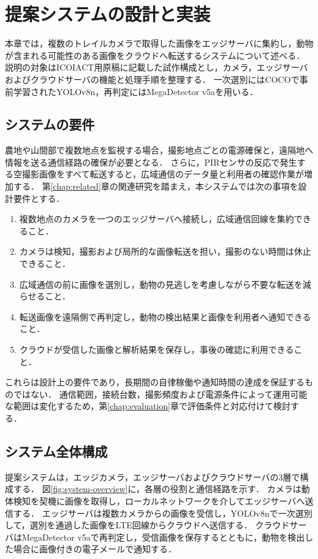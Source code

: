 \chapter{提案システムの設計と実装}
\label{chap:system}

本章では，複数のトレイルカメラで取得した画像をエッジサーバに集約し，動物が含まれる可能性のある画像をクラウドへ転送するシステムについて述べる．
説明の対象はICOIACT用原稿に記載した試作構成とし，カメラ，エッジサーバおよびクラウドサーバの機能と処理手順を整理する．
一次選別にはCOCOで事前学習されたYOLOv8n，再判定にはMegaDetector v5aを用いる．

\section{システムの要件}
農地や山間部で複数地点を監視する場合，撮影地点ごとの電源確保と，遠隔地へ情報を送る通信経路の確保が必要となる．
さらに，PIRセンサの反応で発生する空撮影画像をすべて転送すると，広域通信のデータ量と利用者の確認作業が増加する．
第\ref{chap:related}章の関連研究を踏まえ，本システムでは次の事項を設計要件とする．
\begin{enumerate}
  \item 複数地点のカメラを一つのエッジサーバへ接続し，広域通信回線を集約できること．
  \item カメラは検知，撮影および局所的な画像転送を担い，撮影のない時間は休止できること．
  \item 広域通信の前に画像を選別し，動物の見逃しを考慮しながら不要な転送を減らせること．
  \item 転送画像を遠隔側で再判定し，動物の検出結果と画像を利用者へ通知できること．
  \item クラウドが受信した画像と解析結果を保存し，事後の確認に利用できること．
\end{enumerate}
これらは設計上の要件であり，長期間の自律稼働や通知時間の達成を保証するものではない．
通信範囲，接続台数，撮影頻度および電源条件によって運用可能な範囲は変化するため，第\ref{chap:evaluation}章で評価条件と対応付けて検討する．

\section{システム全体構成}
提案システムは，エッジカメラ，エッジサーバおよびクラウドサーバの3層で構成する．
図\ref{fig:system-overview}に，各層の役割と通信経路を示す．
カメラは動体検知を契機に画像を取得し，ローカルネットワークを介してエッジサーバへ送信する．
エッジサーバは複数カメラからの画像を受信し，YOLOv8nで一次選別して，選別を通過した画像をLTE回線からクラウドへ送信する．
クラウドサーバはMegaDetector v5aで再判定し，受信画像を保存するとともに，動物を検出した場合に画像付きの電子メールで通知する．

